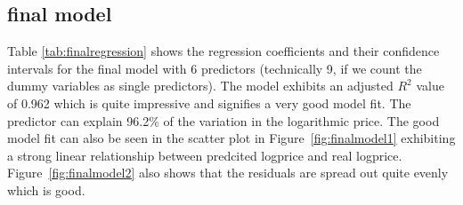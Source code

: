 \documentclass[12 pt]{scrartcl}
\begin{document}
\subsection{final model}

Table \ref{tab:finalregression} shows the regression coefficients and their confidence intervals for the final model with 6 predictors (technically 9, if we count the dummy variables as single predictors). The model exhibits an adjusted $R^2$ value of 0.962 which is quite impressive and signifies a very good model fit. The predictor can explain 96.2\% of the variation in the logarithmic price. The good model fit can also be seen in the scatter plot in Figure~\ref{fig:finalmodel1} exhibiting a strong linear relationship between predcited logprice and real logprice. Figure~\ref{fig:finalmodel2} also shows that the residuals are spread out quite evenly which is good.
\end{document}
